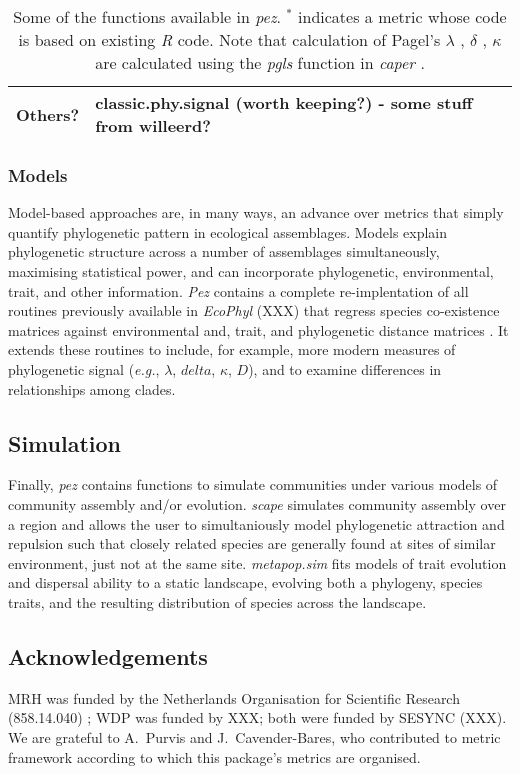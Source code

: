 \documentclass[11pt]{article} %
\begin{document}
\begin{table}
\begin{center}
\begin{tabular}{p{3.5cm} p{14cm}}
  Others? & classic.phy.signal (worth keeping?) - some stuff from willeerd?\\
  \hline
\end{tabular}
\caption{Some of the functions available in \emph{pez}. $^*$ indicates %
  a metric whose code is based on existing \emph{R} code. Note that
  calculation of Pagel's $\lambda$ \autocite{Pagel1999}, $\delta$
  \autocite{Pagel1999}, $\kappa$ \autocite{Pagel1999} are calculated
  using the \emph{pgls} function in \emph{caper} \autocite{Orme2013}.}
\label{metricTable}
\end{center}
\end{table}
\subsubsection*{Models}
Model-based approaches are, in many ways, an advance over metrics that
simply quantify phylogenetic pattern in ecological assemblages. Models
explain phylogenetic structure across a number of assemblages
simultaneously, maximising statistical power, and can incorporate
phylogenetic, environmental, trait, and other information. \emph{Pez}
contains a complete re-implentation of all routines previously
available in \emph{EcoPhyl} (XXX) that regress species co-existence
matrices against environmental and, trait, and phylogenetic distance
matrices \autocite{Cavender-Bares2004,Cavender-Bares2006}. It extends
these routines to include, for example, more modern measures of
phylogenetic signal (\emph{e.g.}, $\lambda$, $delta$, $\kappa$, $D$),
and to examine differences in relationships among clades.
\subsection*{Simulation}
Finally, \emph{pez} contains functions to simulate
communities under various models of community assembly
and/or evolution. \emph{scape} simulates community assembly
over a region and allows the user to simultaniously model phylogenetic attraction and repulsion such that closely related species are generally found at sites of similar environment, just not at the same site. 
\emph{metapop.sim} fits models of trait evolution and dispersal
ability to a static landscape, evolving both a phylogeny, species
traits, and the resulting distribution of species across the
landscape.
\subsection*{Acknowledgements}
MRH was funded by the Netherlands Organisation for Scientific Research (858.14.040) ; WDP was funded by XXX; both were funded by
SESYNC (XXX). We are grateful to A.\ Purvis and J.\ Cavender-Bares,
who contributed to metric framework according to which this package's
metrics are organised.

\printbibliography
\end{document}
